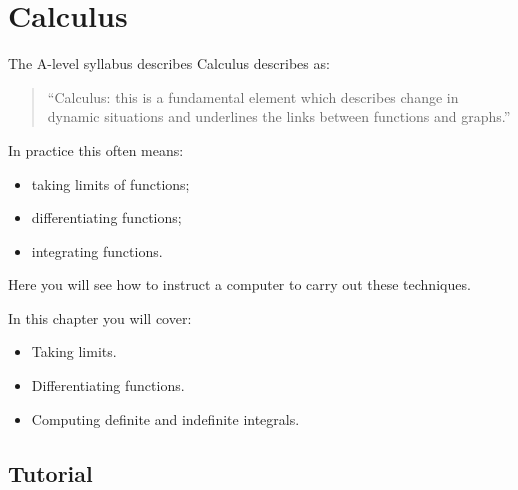 \chapter{Calculus}
\label{\detokenize{tools-for-mathematics/03-calculus/introduction/main:calculus}}\label{\detokenize{tools-for-mathematics/03-calculus/introduction/main::doc}}

The A-level syllabus describes Calculus 
describes
as:

\begin{quote}
``Calculus: this is a fundamental element which describes change in dynamic
situations and underlines the links between functions and graphs.''
\end{quote}


In practice this often means:
\begin{itemize}
\item 

taking limits of functions;

\item 

differentiating functions;

\item 

integrating functions.

\end{itemize}


Here you will see how to instruct a computer to carry out these techniques.



\begin{note}
In this chapter you will cover:
\begin{itemize}
\item 

Taking limits.

\item 

Differentiating functions.

\item 

Computing definite and indefinite integrals.

\end{itemize}
\end{note}





\section{Tutorial}
\label{\detokenize{tools-for-mathematics/03-calculus/tutorial/main:tutorial}}\label{\detokenize{tools-for-mathematics/03-calculus/tutorial/main::doc}}

